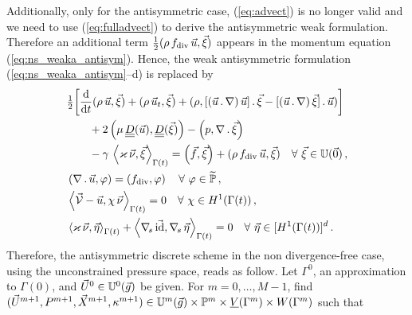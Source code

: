 Additionally, only for the antisymmetric case,  (\ref{eq:advect}) is no longer
valid and we need to use (\ref{eq:fulladvect}) to derive the antisymmetric weak
formulation. Therefore an additional term $\tfrac{1}{2}(\rho\,f_{\rm{div}}\,\vec
u,\vec\xi)$ appears in the momentum equation (\ref{eq:ns_weaka_antisym}).
Hence, the weak antisymmetric formulation (\ref{eq:ns_weaka_antisym}--d) is
replaced by
\begin{subequations}
\begin{align}
& \tfrac{1}{2}\bigg[ \ddt (\rho\,\vec u, \vec \xi) + (\rho\,\vec u_t, \vec \xi)
+ (\rho, [(\vec u\,.\,\nabla)\,\vec u]\,.\,\vec \xi
- [(\vec u\,.\,\nabla)\,\vec \xi]\,.\,\vec u) \bigg] \nonumber \\
& \qquad +2\left(\mu\,\mat D(\vec u), \mat D(\vec \xi)\right)
- \left(p, \nabla\,.\,\vec \xi\right)\nonumber \\
& \qquad - \gamma\,\left\langle \varkappa\,\vec\nu, \vec\xi
\right\rangle_{\Gamma(t)}
= \left(\vec f, \vec \xi\right)+(\rho\,f_{\rm{div}}\,\vec u,\vec\xi)
\quad \forall\ \vec\xi \in \uspace 0 \,,
\label{eq:ns_weaka_antisym_div}\\
& \left(\nabla\,.\,\vec u, \varphi\right) = \left(f_{\rm{div}},\varphi\right)
\quad \forall\ \varphi \in \pnormspace\,, \label{eq:ns_weakb_antisym_div} \\
&  \left\langle \V
- \vec u, \chi\,\vec\nu \right\rangle_{\Gamma(t)} = 0
\quad \forall\ \chi \in H^1(\Gamma(t))\,, \label{eq:ns_weakc_antisym_div} \\
& \left\langle \varkappa\,\vec\nu, \vec\eta \right\rangle_{\Gamma(t)}
+ \left\langle \nabs\,\vec \id, \nabs\,\vec \eta \right\rangle_{\Gamma(t)}
= 0  \quad \forall\ \vec\eta \in
[H^1(\Gamma(t))]^d\,.\label{eq:ns_weakd_antisym_div}
\end{align}
\end{subequations}
Therefore, the antisymmetric discrete scheme in the non divergence-free case,
using the unconstrained pressure space, reads as follow. Let $\Gamma^0$, an
approximation to $\Gamma(0)$, and $\vec U^0\in \uspacedisc{g}{0}$ be given. For
$m=0,\ldots, M-1$, find $(\vec U^{m+1},P^{m+1}, \vec X^{m+1}, \kappa^{m+1}) \in
\uspacedisc{g}{m}\times \pspace^m \times \Vh \times \Wh$ such that
